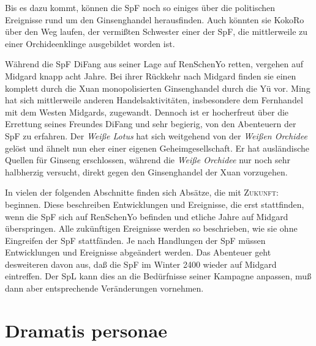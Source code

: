 \documentclass[
a4paper,
twoside,
DIV=calc,
BCOR=4mm,
fontsize=9pt,
twocolumn=on,
titlepage=on,
parskip=half
]{scrartcl}
\begin{document}
Bis es dazu kommt, können die SpF noch so einiges über die politischen
Ereignisse rund um den Ginsenghandel herausfinden. Auch könnten sie
KokoRo über den Weg laufen, der vermißten Schwester einer der SpF, die
mittlerweile zu einer Orchideenklinge ausgebildet worden ist.

Während die SpF DiFang aus seiner Lage auf RenSchenYo retten, vergehen
auf Midgard knapp acht Jahre. Bei ihrer Rückkehr nach Midgard finden
sie einen komplett durch die Xuan monopolisierten Ginsenghandel durch
die Yü vor. Ming hat sich mittlerweile anderen Handelsaktivitäten,
insbesondere dem Fernhandel mit dem Westen Midgards,
zugewandt. Dennoch ist er hocherfreut über die Errettung seines
Freundes DiFang und sehr begierig, von den Abenteuern der SpF zu
erfahren. Der \emph{Weiße Lotus} hat sich weitgehend von der
\emph{Weißen Orchidee} gelöst und ähnelt nun eher einer eigenen
Geheimgesellschaft. Er hat ausländische Quellen für Ginseng
erschlossen, während die \emph{Weiße Orchidee} nur noch sehr
halbherzig versucht, direkt gegen den Ginsenghandel der Xuan
vorzugehen.

In vielen der folgenden Abschnitte finden sich Absätze, die mit
\textsc{Zukunft:} beginnen. Diese beschreiben Entwicklungen und
Ereignisse, die erst stattfinden, wenn die SpF sich auf RenSchenYo
befinden und etliche Jahre auf Midgard überspringen.  Alle zukünftigen
Ereignisse werden so beschrieben, wie sie ohne Eingreifen der SpF
stattfänden. Je nach Handlungen der SpF müssen Entwicklungen und
Ereignisse abgeändert werden. Das Abenteuer geht desweiteren davon
aus, daß die SpF im Winter 2400 wieder auf Midgard eintreffen. Der SpL
kann dies an die Bedürfnisse seiner Kampagne anpassen, muß dann aber
entsprechende Veränderungen vornehmen.

\section{Dramatis personae}
\end{document}

